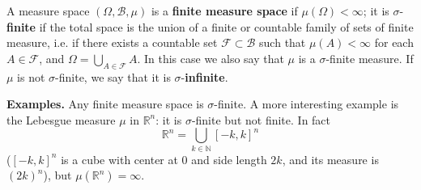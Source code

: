\documentclass[12pt]{article}
\begin{document}
A measure space $(\Omega, \mathcal{B}, \mu)$ is a \textbf{finite measure space} if $\mu(\Omega)<\infty$; it is $\sigma$-\textbf{finite} if the total space is the union of a finite or countable family of sets of finite measure, i.e. if there exists a countable set $\mathcal{F}\subset \mathcal{B}$ such that $\mu(A)<\infty$ for each $A\in \mathcal{F}$, and
$\Omega=\bigcup_{A\in\mathcal{F}} A.$
In this case we also say that $\mu$ is a $\sigma$-finite measure.
If $\mu$ is not $\sigma$-finite, we say that it is $\sigma$-\textbf{infinite}.

\textbf{Examples.} Any finite measure space is $\sigma$-finite. A more interesting example is the Lebesgue measure $\mu$ in $\mathbb{R}^n$: it is $\sigma$-finite but not finite. In fact $$\mathbb{R}^n=\bigcup_{k\in\mathbb{N}} [-k,k]^n$$ ($[-k,k]^n$ is a cube with center at $0$ and side length $2k$, and its measure is $(2k)^n$), but $\mu(\mathbb{R}^n)=\infty$.
\end{document}
